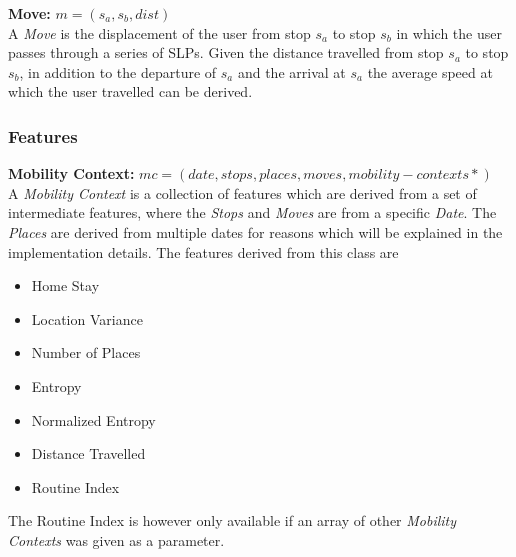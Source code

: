\textbf{Move:} $m = (s_a, s_b, dist)$\\
A \textit{Move} is the displacement of the user from stop $s_a$ to stop $s_b$ in which the user passes through a series of SLPs. Given the distance travelled from stop $s_a$ to stop $s_b$, in addition to the departure of $s_a$ and the arrival at $s_a$ the average speed at which the user travelled can be derived. 

\subsubsection*{Features}
\textbf{Mobility Context:} $mc = (date, stops, places, moves, mobility-contexts*)$\\
A \textit{Mobility Context} is a collection of features which are derived from a set of intermediate features, where the \textit{Stops} and \textit{Moves} are from a specific \textit{Date}. The \textit{Places} are derived from multiple dates for reasons which will be explained in the implementation details. The features derived from this class are

\begin{itemize}
    \item Home Stay
    \item Location Variance
    \item Number of Places
    \item Entropy
    \item Normalized Entropy
    \item Distance Travelled
    \item Routine Index
\end{itemize}

The Routine Index is however only available if an array of other \textit{Mobility Contexts} was given as a parameter.

